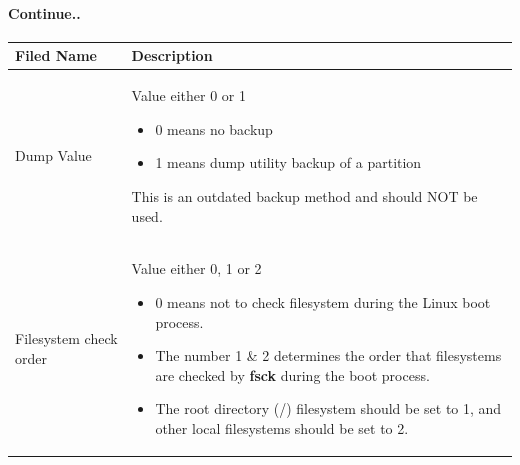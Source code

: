 \begin{flushleft}
\paragraph{Continue..}
\bigskip
\begin{tabulary}{1.0\textwidth}{|p{5em}|p{23em}|}
	\toprule
	\textbf{Filed Name} & \textbf{Description}\\
	\midrule
	Dump Value & Value either 0 or 1
	\begin{itemize}
		\item 0 means no backup
		\item 1 means dump utility backup of a partition
	\end{itemize}
	This is an outdated backup method and should NOT be used. \\
	\hline
	Filesystem check order & Value either 0, 1 or 2
	\begin{itemize}
		\item 0 means not to check filesystem during the Linux boot process. 
		\item The number 1 \& 2 determines the order that filesystems are checked by \textbf{fsck} during the boot process.
		\item The root directory (/) filesystem should be set to 1, and other local filesystems should be set to 2.
	\end{itemize} \\
	\bottomrule
\end{tabulary}



\end{flushleft}

\newpage

